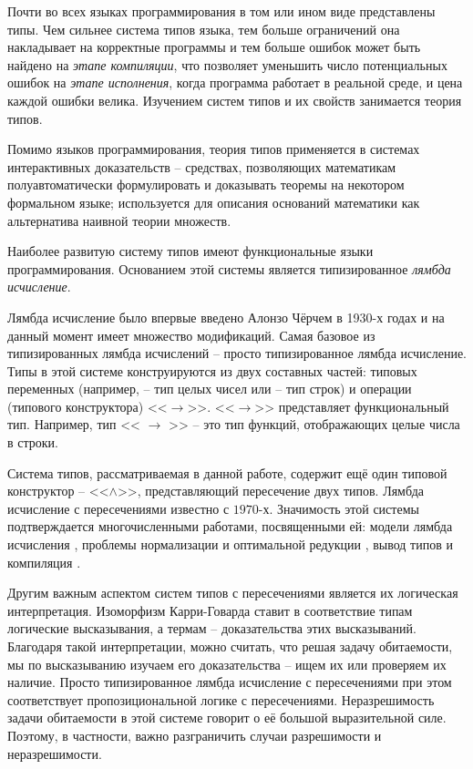 \documentclass[../main.tex]{subfiles}
\begin{document}
 \label{sec:introduction}

Почти во всех языках программирования в том или ином виде представлены типы. Чем сильнее система типов языка, тем больше ограничений она накладывает на корректные программы и тем больше ошибок может быть найдено на {\it этапе компиляции}, что позволяет уменьшить число потенциальных ошибок на {\it этапе исполнения}, когда программа работает в реальной среде, и цена каждой ошибки велика. Изучением систем типов и их свойств занимается теория типов. 

Помимо языков программирования, теория типов применяется в системах интерактивных доказательств -- средствах, позволяющих математикам полуавтоматически формулировать и доказывать теоремы на некотором формальном языке; используется для описания оснований математики как альтернатива наивной теории множеств.

\emptyline

Наиболее развитую систему типов имеют функциональные языки программирования. Основанием этой системы является типизированное {\it лямбда исчисление}.

Лямбда исчисление было впервые введено Алонзо Чёрчем в 1930-х годах и на данный момент имеет множество модификаций. Самая базовое из типизированных лямбда исчислений -- просто типизированное лямбда исчисление. Типы в этой системе конструируются из двух составных частей: типовых переменных (например,  -- тип целых чисел или  -- тип строк) и операции (типового конструктора) <<$\to$>>. <<$\to$>> представляет функциональный тип. Например, тип << $\to$ >> -- это тип функций, отображающих целые числа в строки. 

Система типов, рассматриваемая в данной работе, содержит ещё один типовой конструктор -- <<$\wedge$>>, представляющий пересечение двух типов. Лямбда исчисление с пересечениями известно с $1970$-х. Значимость этой системы подтверждается многочисленными работами, посвященными ей: модели лямбда исчисления \cite{alessi_2006, coppo_1980}, проблемы нормализации и оптимальной редукции \cite{neergaard_2004, pottinger_1980}, вывод типов и компиляция \cite{kfoury_2004, wells_2002}.

Другим важным аспектом систем типов с пересечениями является их логическая интерпретация. Изоморфизм Карри-Говарда ставит в соответствие типам логические высказывания, а термам -- доказательства этих высказываний. 
Благодаря такой интерпретации, можно считать, что решая задачу обитаемости, мы по высказыванию изучаем его доказательства -- ищем их или проверяем их наличие.
Просто типизированное лямбда исчисление с пересечениями при этом соответствует пропозициональной логике с пересечениями. Неразрешимость задачи обитаемости в этой системе \cite{urzyczyn_1999} говорит о её большой выразительной силе. Поэтому, в частности, важно разграничить случаи разрешимости и неразрешимости. 
\end{document}
